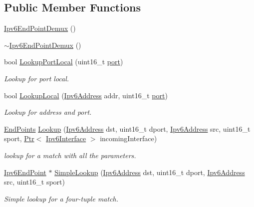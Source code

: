 \subsection*{Public Member Functions}
\begin{DoxyCompactItemize}
\item 
\hyperlink{classns3_1_1Ipv6EndPointDemux_a2c5834928ee16ad40289e4762ebf040e}{Ipv6\+End\+Point\+Demux} ()
\item 
\hyperlink{classns3_1_1Ipv6EndPointDemux_a2880679dcb5239885b98dec52006170c}{$\sim$\+Ipv6\+End\+Point\+Demux} ()
\item 
bool \hyperlink{classns3_1_1Ipv6EndPointDemux_aaa271fc147c575d73ed98dcc7c9845c0}{Lookup\+Port\+Local} (uint16\+\_\+t \hyperlink{visualizer-ideas_8txt_a21ff1c530daf8435e00048b7fc2c58e3}{port})
\begin{DoxyCompactList}\small\item\em Lookup for port local. \end{DoxyCompactList}\item 
bool \hyperlink{classns3_1_1Ipv6EndPointDemux_a73e4035ff255c9145d809aa76df3861f}{Lookup\+Local} (\hyperlink{classns3_1_1Ipv6Address}{Ipv6\+Address} addr, uint16\+\_\+t \hyperlink{visualizer-ideas_8txt_a21ff1c530daf8435e00048b7fc2c58e3}{port})
\begin{DoxyCompactList}\small\item\em Lookup for address and port. \end{DoxyCompactList}\item 
\hyperlink{classns3_1_1Ipv6EndPointDemux_a40c1d59189759e1e7f5cabe7cd01c0fa}{End\+Points} \hyperlink{classns3_1_1Ipv6EndPointDemux_a14fd788471bcde832d3f125bdfabc24b}{Lookup} (\hyperlink{classns3_1_1Ipv6Address}{Ipv6\+Address} dst, uint16\+\_\+t dport, \hyperlink{classns3_1_1Ipv6Address}{Ipv6\+Address} src, uint16\+\_\+t sport, \hyperlink{classns3_1_1Ptr}{Ptr}$<$ \hyperlink{classns3_1_1Ipv6Interface}{Ipv6\+Interface} $>$ incoming\+Interface)
\begin{DoxyCompactList}\small\item\em lookup for a match with all the parameters. \end{DoxyCompactList}\item 
\hyperlink{classns3_1_1Ipv6EndPoint}{Ipv6\+End\+Point} $\ast$ \hyperlink{classns3_1_1Ipv6EndPointDemux_aa6fa6603f213bd48e6b03e68d6cef80b}{Simple\+Lookup} (\hyperlink{classns3_1_1Ipv6Address}{Ipv6\+Address} dst, uint16\+\_\+t dport, \hyperlink{classns3_1_1Ipv6Address}{Ipv6\+Address} src, uint16\+\_\+t sport)
\begin{DoxyCompactList}\small\item\em Simple lookup for a four-\/tuple match. \end{DoxyCompactList}\item 

\end{DoxyCompactItemize}
